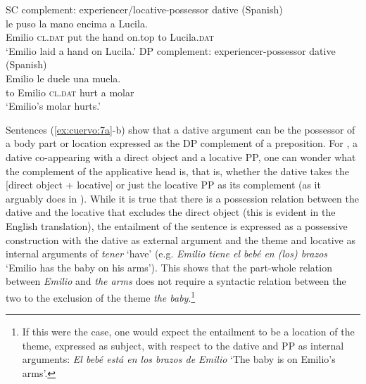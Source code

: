 \documentclass[output=paper,colorlinks,citecolor=brown,nonflat]{./langscibook}
\begin{document}
\ea%
    \label{ex:cuervo:8}
    \ea%
        \label{ex:cuervo:8a}
        SC complement: experiencer/locative-possessor dative   (Spanish)\\
         {le} {puso} {la} {mano} {encima}{\footnotemark} {a} {Lucila}.\\
        Emilio   \textsc{cl.dat} put   the hand on.top  {to} Lucila.\textsc{dat}\\
        \glt ‘Emilio laid a hand on Lucila.’
    \ex%
        \label{ex:cuervo:8b}
        DP complement: experiencer-possessor dative (Spanish)\\
         {Emilio} {le} {duele} {una} {muela}.\\
        {to} Emilio \textsc{cl.dat} hurt a molar\\
        \glt ‘Emilio’s molar hurts.’
    \z
\z

Sentences (\ref{ex:cuervo:7a}-b) show that a dative argument can be the possessor of a body part or location expressed as the DP complement of a preposition. For , a dative co-appearing with a direct object and a locative PP, one can wonder what the complement of the applicative head is, that is, whether the dative takes the [direct object + locative] or just the locative PP as its complement (as it arguably does in ). While it is true that there is a possession relation between the dative and the locative that excludes the direct object (this is evident in the English translation), the entailment of the sentence is expressed as a possessive construction with the dative as external argument and the theme and locative as internal arguments of \textit{tener} ‘have’ (e.g. \textit{Emilio tiene el bebé en (los) brazos} ‘Emilio has the baby on his arms’).  This shows that the part-whole relation between \textit{Emilio} and \textit{the arms} does not require a syntactic relation between the two to the exclusion of the theme \textit{the baby}.\footnote{If this were the case, one would expect the entailment to be a location of the theme, expressed as subject, with respect to the dative and PP as internal arguments: \textit{El bebé está en los brazos de Emilio} ‘The baby is on Emilio’s arms’.}     
\end{document}

